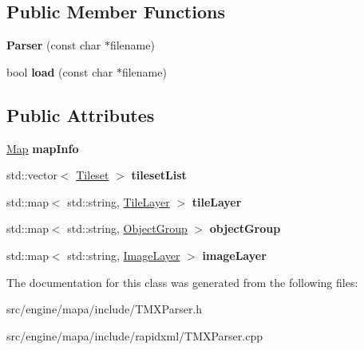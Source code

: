 \subsection*{Public Member Functions}
\begin{DoxyCompactItemize}
\item 
{\bfseries Parser} (const char $\ast$filename)\hypertarget{class_t_m_x_1_1_parser_a8ea6e0038d114c170cdc7dbafac812a2}{}\label{class_t_m_x_1_1_parser_a8ea6e0038d114c170cdc7dbafac812a2}

\item 
bool {\bfseries load} (const char $\ast$filename)\hypertarget{class_t_m_x_1_1_parser_a7475f0d3e935c9d7419518e4dede2fe7}{}\label{class_t_m_x_1_1_parser_a7475f0d3e935c9d7419518e4dede2fe7}

\end{DoxyCompactItemize}
\subsection*{Public Attributes}
\begin{DoxyCompactItemize}
\item 
\hyperlink{struct_t_m_x_1_1_parser_1_1_map}{Map} {\bfseries map\+Info}\hypertarget{class_t_m_x_1_1_parser_a16d494d2febb4660684038c96b2f1541}{}\label{class_t_m_x_1_1_parser_a16d494d2febb4660684038c96b2f1541}

\item 
std\+::vector$<$ \hyperlink{struct_t_m_x_1_1_parser_1_1_tileset}{Tileset} $>$ {\bfseries tileset\+List}\hypertarget{class_t_m_x_1_1_parser_a3e2349ff437ab570798ded5cb35e4cd2}{}\label{class_t_m_x_1_1_parser_a3e2349ff437ab570798ded5cb35e4cd2}

\item 
std\+::map$<$ std\+::string, \hyperlink{struct_t_m_x_1_1_parser_1_1_tile_layer}{Tile\+Layer} $>$ {\bfseries tile\+Layer}\hypertarget{class_t_m_x_1_1_parser_a2b150ef5cf72295f07a999e576301765}{}\label{class_t_m_x_1_1_parser_a2b150ef5cf72295f07a999e576301765}

\item 
std\+::map$<$ std\+::string, \hyperlink{struct_t_m_x_1_1_parser_1_1_object_group}{Object\+Group} $>$ {\bfseries object\+Group}\hypertarget{class_t_m_x_1_1_parser_af909967ab7f73b65cebe70bd30887847}{}\label{class_t_m_x_1_1_parser_af909967ab7f73b65cebe70bd30887847}

\item 
std\+::map$<$ std\+::string, \hyperlink{struct_t_m_x_1_1_parser_1_1_image_layer}{Image\+Layer} $>$ {\bfseries image\+Layer}\hypertarget{class_t_m_x_1_1_parser_af6809b06de1dced79192746f665660ce}{}\label{class_t_m_x_1_1_parser_af6809b06de1dced79192746f665660ce}

\end{DoxyCompactItemize}


The documentation for this class was generated from the following files\+:\begin{DoxyCompactItemize}
\item 
src/engine/mapa/include/T\+M\+X\+Parser.\+h\item 
src/engine/mapa/include/rapidxml/T\+M\+X\+Parser.\+cpp\end{DoxyCompactItemize}
